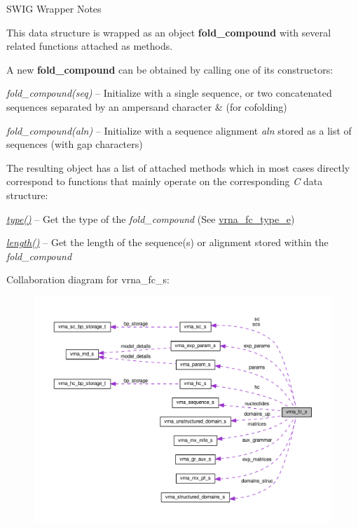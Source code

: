 \begin{DoxyRefDesc}{S\+W\+I\+G Wrapper Notes}
\item[\hyperlink{wrappers__wrappers000073}{S\+W\+I\+G Wrapper Notes}]

This data structure is wrapped as an object {\bfseries fold\+\_\+compound} with several related functions attached as methods.

A new {\bfseries fold\+\_\+compound} can be obtained by calling one of its constructors\+:~\newline

\begin{DoxyItemize}
\item {\itshape fold\+\_\+compound(seq)} -- Initialize with a single sequence, or two concatenated sequences separated by an ampersand character \textquotesingle{}\&\textquotesingle{} (for cofolding)
\item {\itshape fold\+\_\+compound(aln)} -- Initialize with a sequence alignment {\itshape aln} stored as a list of sequences (with gap characters)
\end{DoxyItemize}The resulting object has a list of attached methods which in most cases directly correspond to functions that mainly operate on the corresponding {\itshape C} data structure\+:~\newline

\begin{DoxyItemize}
\item {\itshape \hyperlink{group__fold__compound_a391bcf8ac5997784aaf780cdd251c464}{type()}} -- Get the type of the {\itshape fold\+\_\+compound} (See \hyperlink{group__fold__compound_ga01a4ff86fa71deaaa5d1abbd95a1447d}{vrna\+\_\+fc\+\_\+type\+\_\+e})
\item {\itshape \hyperlink{group__fold__compound_a95fbfed770b858e50c766505dc4bf998}{length()}} -- Get the length of the sequence(s) or alignment stored within the {\itshape fold\+\_\+compound} 
\end{DoxyItemize}\end{DoxyRefDesc}


Collaboration diagram for vrna\+\_\+fc\+\_\+s\+:
\nopagebreak
\begin{figure}[H]
\begin{center}
\leavevmode
\includegraphics[width=350pt]{structvrna__fc__s__coll__graph}
\end{center}
\end{figure}
